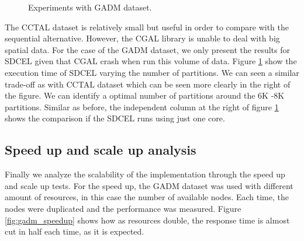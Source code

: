 \begin{figure}[!ht]
    \centering
    \hfill
    \caption{Experiments with GADM dataset. \label{fig:gadm}} 
\end{figure}

The CCTAL dataset is relatively small but useful in order to compare with the sequential alternative.  However, the CGAL library is unable to deal with big spatial data.  For the case of the GADM dataset, we only present the results for SDCEL given that CGAL crash when run this volume of data.  Figure \ref{fig:gadm} show the execution time of SDCEL varying the number of partitions.  We can seen a similar trade-off as with CCTAL dataset which can be seen more clearly in the right of the figure.  We can identify a optimal number of partitions around the 6K -8K partitions.  Similar as before, the independent column at the right of figure \ref{fig:gadm} shows the comparison if the SDCEL runs using just one core.

\subsection{Speed up and scale up analysis}

Finally we analyze the scalability of the implementation through the speed up and scale up tests.  For the speed up, the GADM dataset was used with different amount of resources, in this case the number of available nodes.  Each time, the nodes were duplicated and the performance was measured.  Figure \ref{fig:gadm_speedup} shows  how as resources double, the response time is almost cut in half each time, as it is expected.


